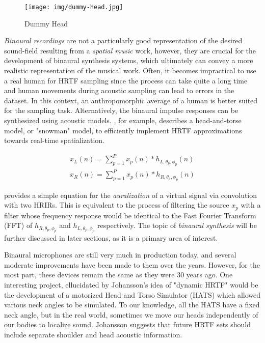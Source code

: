 \begin{figure}[ht!]%
\centering
\texttt{[image: img/dummy-head.jpg]} 
\label{fig:dummy-head}
\caption{Dummy Head \cite{FileGeor45online}}
\end{figure}

\textit{Binaural recordings} are not a particularly good representation of the desired sound-field resulting from a \textit{spatial music} work, however, they are crucial for the development of binaural synthesis systems, which ultimately can convey a more realistic representation of the musical work. Often, it becomes impractical to use a real human for HRTF sampling since the process can take quite a long time and human movements during acoustic sampling can lead to errors in the dataset. In this context, an anthropomorphic average of a human is better suited for the sampling task. Alternatively, the binaural impulse responses can be synthesized using acoustic models. \cite{algazi2002use}, for example, describes a head-and-torse model, or "snowman" model, to efficiently implement HRTF approximations towards real-time spatialization. 

\begin{equation} \label{eq:conv-hrir}
\begin{array}{l}
x_{L}(n)=\sum_{p=1}^{P} x_{p}(n) * h_{L, \theta_{p}, \phi_{p}}(n) \\
x_{R}(n)=\sum_{p=1}^{P} x_{p}(n) * h_{R, \theta_{p}, \phi_{p}}(n)
\end{array}
\end{equation}

\cite{hacihabiboglu2017perceptual} provides a simple equation for the \textit{auralization} of a virtual signal via convolution with two HRIRs. This is equivalent to the process of filtering the source $x_p$ with a filter whose frequency response would be identical to the Fast Fourier Transform (FFT) of $h_{R, \theta_{p}, \phi_{p}}$ and $h_{L, \theta_{p}, \phi_{p}}$ respectively. The topic of \textit{binaural synthesis} will be further discussed in later sections, as it is a primary area of interest.

Binaural microphones are still very much in production today, and several moderate improvements have been made to them over the years. However, for the most part, these devices remain the same as they were 30 years ago. One interesting project, ellucidated by Johansson's \cite{johansson2019vr} idea of "dynamic HRTF" would be the development of a motorized Head and Torso Simulator (HATS) which allowed various neck angles to be simulated. To our knowledge, all the HATS have a fixed neck angle, but in the real world, sometimes we move our heads independently of our bodies to localize sound. Johansson suggests that future HRTF sets should include separate shoulder and head acoustic information.


